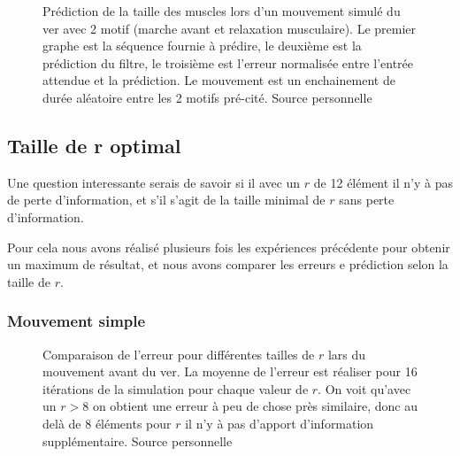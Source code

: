 \begin{figure}[ht]
   \begin{center}
   \end{center}
   \caption[Prédiction de la taille des muscles lors d'un mouvement avec 2
   motif]{Prédiction de la taille des muscles lors d'un mouvement simulé du ver
   avec 2 motif (marche avant et relaxation musculaire). Le premier graphe est
   la séquence fournie à prédire, le deuxième est la prédiction du filtre, le
   troisième est l'erreur normalisée entre l'entrée attendue et la prédiction.
   Le mouvement est un enchainement de durée aléatoire entre les 2 motifs
   pré-cité. Source personnelle}
   \label{fig:sequence_mouvement_complexe_2pattern}
\end{figure}


\subsection{Taille de r optimal} %
\label{sub:Taille de r optimal}

Une question interessante serais de savoir si il avec un $r$ de 12 élément il n'y à
pas de perte d'information, et s'il s'agit de la taille minimal de $r$ sans perte
d'information.

Pour cela nous avons réalisé plusieurs fois les expériences précédente pour obtenir
un maximum de résultat, et nous avons comparer les erreurs e prédiction selon la
taille de $r$.

\subsubsection{Mouvement simple} %
\label{ssub:Mouvement simple}

\begin{figure}[h]
   \begin{center}
   \end{center}
   \caption[Comparaison de l'erreur pour différents $r$ lors du mouvement avant]{
   Comparaison de l'erreur pour différentes tailles de $r$ lars du mouvement avant
   du ver. La moyenne de l'erreur est réaliser pour 16 itérations de la simulation
   pour chaque valeur de $r$. On voit qu'avec un $r > 8$ on obtient une erreur à
   peu de chose près similaire, donc au delà de 8 éléments pour $r$ il n'y à pas
   d'apport d'information supplémentaire. Source personnelle}
   \label{fig:comparaison_r_mouvement_simple}
\end{figure}

